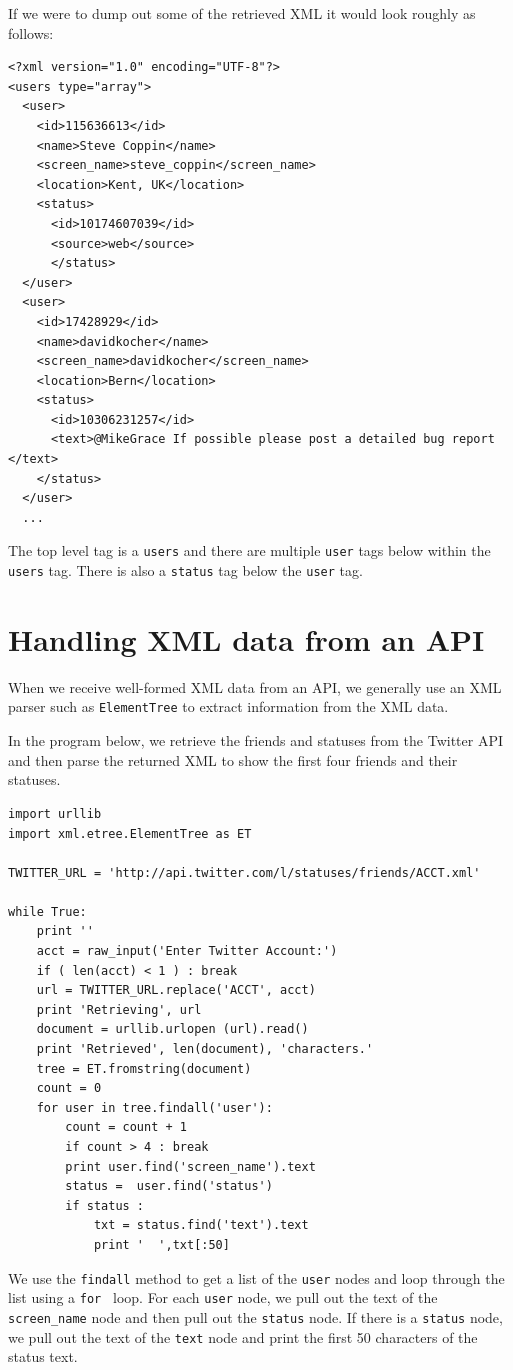 If we were to dump out some of the retrieved XML it would look roughly as follows:

\beforeverb
\begin{verbatim}
<?xml version="1.0" encoding="UTF-8"?>
<users type="array">
  <user>
    <id>115636613</id>
    <name>Steve Coppin</name>
    <screen_name>steve_coppin</screen_name>
    <location>Kent, UK</location>
    <status>
      <id>10174607039</id>
      <source>web</source>
      </status>
  </user>
  <user>
    <id>17428929</id>
    <name>davidkocher</name>
    <screen_name>davidkocher</screen_name>
    <location>Bern</location>
    <status>
      <id>10306231257</id>
      <text>@MikeGrace If possible please post a detailed bug report </text>
    </status>
  </user>
  ...
\end{verbatim}
\afterverb
%
The top level tag is a {\tt users} and there are multiple {\tt user} tags
below within the {\tt users} tag.   There is also a {\tt status} tag below
the {\tt user} tag.  

\section{Handling XML data from an API}

When we receive well-formed XML data from an API, we generally use
an XML parser such as {\tt ElementTree} to extract information from
the XML data.

In the program below, we retrieve the friends and statuses from
the Twitter API and then parse the returned XML to show the first
four friends and their statuses.

\beforeverb
\begin{verbatim}
import urllib
import xml.etree.ElementTree as ET

TWITTER_URL = 'http://api.twitter.com/l/statuses/friends/ACCT.xml'

while True:
    print ''
    acct = raw_input('Enter Twitter Account:')
    if ( len(acct) < 1 ) : break
    url = TWITTER_URL.replace('ACCT', acct)
    print 'Retrieving', url
    document = urllib.urlopen (url).read()
    print 'Retrieved', len(document), 'characters.' 
    tree = ET.fromstring(document)
    count = 0
    for user in tree.findall('user'):
        count = count + 1
        if count > 4 : break
        print user.find('screen_name').text
        status =  user.find('status')
        if status : 
            txt = status.find('text').text
            print '  ',txt[:50]
\end{verbatim}
\afterverb
%
We use the {\tt findall} method to get a list of the {\tt user} 
nodes and loop through the list using a {\tt for } loop.  
For each {\tt user} node, we pull out the text of the \verb"screen_name" node
and then pull out the {\tt status} node.   If there is a {\tt status}
node, we pull out the text of the {\tt text} node and print the first 50 
characters of the status text.

